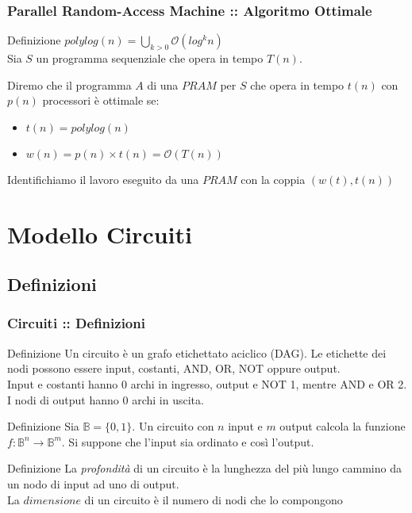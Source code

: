 \documentclass{beamer}
\newcommand{\bigO}{\ensuremath{\mathcal{O}}} %
\begin{document}
\begin{frame}
	\frametitle{Parallel Random-Access Machine :: Algoritmo Ottimale} %
	
	\begin{block}{Definizione}
	$polylog(n) = \bigcup_{k>0}\bigO{(log^k n)}$\\
	Sia $S$ un programma sequenziale che opera in tempo $T(n)$.\\
	\end{block}
	Diremo che il programma $A$ di una $PRAM$ per $S$ che opera in tempo $t(n)$ con $p(n)$ processori è ottimale se:
	\begin{itemize}
		\item $t(n) = polylog(n)$
		\item $w(n) = p(n)\times t(n) = \bigO{(T(n))}$
	\end{itemize}
	Identifichiamo il lavoro eseguito da una $PRAM$ con la coppia $(w(t),t(n))$
\end{frame}



\section{Modello Circuiti}
\subsection{Definizioni}
\begin{frame}
	\frametitle{Circuiti :: Definizioni} %
	
	\begin{block}{Definizione}
		Un circuito è un grafo etichettato aciclico (DAG). Le etichette dei nodi possono essere input, costanti, AND, OR, NOT oppure output.\\ 
		Input e costanti hanno 0 archi in ingresso, output e NOT 1, mentre AND e OR 2. I nodi di output hanno 0 archi in uscita.
	\end{block}
	\begin{block}{Definizione}
		Sia $\mathbb{B} = \{0,1\}$. Un circuito con $n$ input e $m$ output calcola la funzione $f\colon \mathbb{B}^n\to\mathbb{B}^m$. Si suppone che l'input sia ordinato e così l'output.
	\end{block}
	\begin{block}{Definizione}
		La \emph{profondità} di un circuito è la lunghezza del più lungo cammino da un nodo di input ad uno di output.\\
		La $dimensione$ di un circuito è il numero di nodi che lo compongono 
	\end{block}
	
\end{frame}
\end{document}
